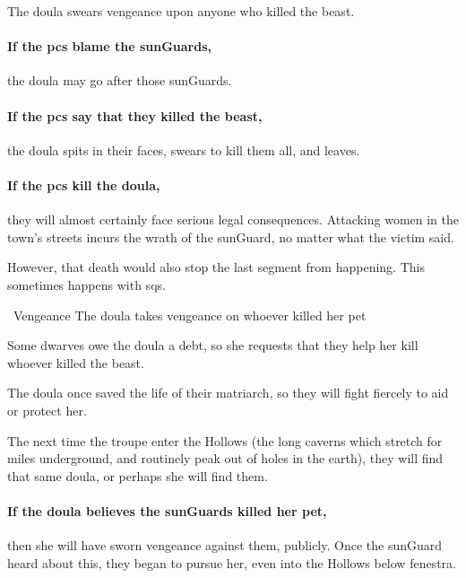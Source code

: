 \begin{multicols}{2}
The \gls{doula} swears vengeance upon anyone who killed the beast.

\paragraph{If the \glspl{pc} blame the \glspl{sunGuard},}
the \gls{doula} may go after those \glspl{sunGuard}.

\paragraph{If the \glspl{pc} say that they killed the beast,}
the \gls{doula} spits in their faces, swears to kill them all, and leaves.

\paragraph{If the \glspl{pc} kill the \gls{doula},}
they will almost certainly face serious legal consequences.
Attacking women in the town's streets incurs the wrath of the \gls{sunGuard}, no matter what the victim said.

However, that death would also stop the last \gls{segment} from happening.
This sometimes happens with \glspl{sq}.

{\squash~Vengeance}%
{The \gls{doula} takes vengeance on whoever killed her pet}%

\begin{exampletext}
  Some dwarves owe the \gls{doula} a debt, so she requests that they help her kill whoever killed the beast.

  The \gls{doula} once saved the life of their matriarch, so they will fight fiercely to aid or protect her.
\end{exampletext}

The next time the troupe enter the Hollows (the long caverns which stretch for miles underground, and routinely peak out of holes in the earth), they will find that same \gls{doula}, or perhaps she will find them.

\paragraph{If the \gls{doula} believes the \glspl{sunGuard} killed her pet,}
then she will have sworn vengeance against them, publicly.
Once the \gls{sunGuard} heard about this, they began to pursue her, even into the Hollows below \gls{fenestra}.


\end{multicols}
